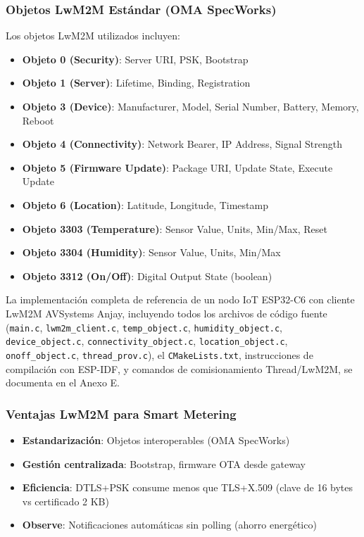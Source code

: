 \subsubsection{Objetos LwM2M Estándar (OMA SpecWorks)}

Los objetos LwM2M utilizados incluyen:
\begin{itemize}
    \item \textbf{Objeto 0 (Security)}: Server URI, PSK, Bootstrap
    \item \textbf{Objeto 1 (Server)}: Lifetime, Binding, Registration
    \item \textbf{Objeto 3 (Device)}: Manufacturer, Model, Serial Number, Battery, Memory, Reboot
    \item \textbf{Objeto 4 (Connectivity)}: Network Bearer, IP Address, Signal Strength
    \item \textbf{Objeto 5 (Firmware Update)}: Package URI, Update State, Execute Update
    \item \textbf{Objeto 6 (Location)}: Latitude, Longitude, Timestamp
    \item \textbf{Objeto 3303 (Temperature)}: Sensor Value, Units, Min/Max, Reset
    \item \textbf{Objeto 3304 (Humidity)}: Sensor Value, Units, Min/Max
    \item \textbf{Objeto 3312 (On/Off)}: Digital Output State (boolean)
\end{itemize}

La implementación completa de referencia de un nodo IoT ESP32-C6 con cliente LwM2M AVSystems Anjay, incluyendo todos los archivos de código fuente (\texttt{main.c}, \texttt{lwm2m\_client.c}, \texttt{temp\_object.c}, \texttt{humidity\_object.c}, \texttt{device\_object.c}, \texttt{connectivity\_object.c}, \texttt{location\_object.c}, \texttt{onoff\_object.c}, \texttt{thread\_prov.c}), el \texttt{CMakeLists.txt}, instrucciones de compilación con ESP-IDF, y comandos de comisionamiento Thread/LwM2M, se documenta en el Anexo E.

\subsubsection{Ventajas LwM2M para Smart Metering}
\begin{itemize}
    \item \textbf{Estandarización}: Objetos interoperables (OMA SpecWorks)
    \item \textbf{Gestión centralizada}: Bootstrap, firmware OTA desde gateway
    \item \textbf{Eficiencia}: DTLS+PSK consume menos que TLS+X.509 (clave de 16 bytes vs certificado 2 KB)
    \item \textbf{Observe}: Notificaciones automáticas sin polling (ahorro energético)
\end{itemize}

